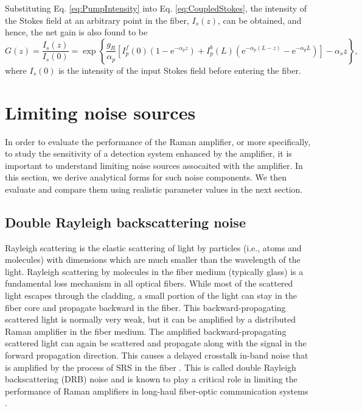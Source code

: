 \documentclass[10pt,letterpaper]{article}
\begin{document}
Substituting Eq. \ref{eq:PumpIntensity} into Eq. \ref{eq:CoupledStokes}, the intensity of the Stokes field at an arbitrary point in the fiber, $I_s(z)$, can be obtained, and hence, the net gain is also found to be
\begin{equation}
G(z)=\frac{I_s(z)}{I_{s}(0)}=\exp\left\{\frac{g_R}{\alpha_p} \left[I_{p}^f(0)\left(1-\mathrm{e}^{-\alpha_p z}\right)+I_{p}^b(L)\left(\mathrm{e}^{-\alpha_p (L-z)}-\mathrm{e}^{-\alpha_p L}\right)\right]- \alpha_s z\right\}, \label{eq:Gain}
\end{equation}
where $I_s(0)$ is the intensity of the input Stokes field before entering the fiber. 

\section{Limiting noise sources}
\label{noise_sources}

In order to evaluate the performance of the Raman amplifier, or more specifically, to study the sensitivity of a detection system enhanced by the amplifier, it is important to understand limiting noise sources assocaited with the amplifier. In this section, we derive analytical forms for such noise components. We then evaluate and compare them using realistic parameter values in the next section. 

\subsection{Double Rayleigh backscattering noise}
Rayleigh scattering is the elastic scattering of light by particles (i.e., atoms and molecules) with dimensions which are much smaller than the wavelength of the light. Rayleigh scattering by molecules in the fiber medium (typically glass) is a fundamental loss mechanism in all optical fibers. While most of the scattered light escapes through the cladding, a small portion of the light can stay in the fiber core and propagate backward in the fiber. This backward-propagating scattered light is normally very weak, but it can be amplified by a distributed Raman amplifier in the fiber medium. The amplified backward-propagating scattered light can again be scattered and propagate along with the signal in the forward propagation direction. This causes a delayed crosstalk in-band noise that is amplified by the process of SRS in the fiber \cite{agrawal2002wiley,kim2002ieeephotonictechl}. This is called double Rayleigh backscattering (DRB) noise \cite{islam2004springer,lewis2000ieeephotonictechl} and is known to play a critical role in limiting the performance of Raman amplifiers in long-haul fiber-optic communication systems \cite{hansen1998ieeephotonictechl}. 
\end{document}
